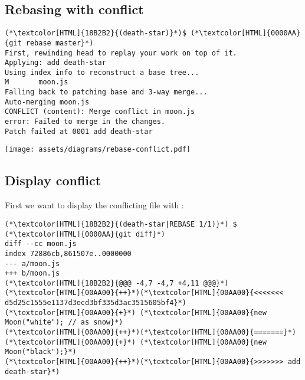 \subsection{Rebasing with conflict}
\begin{frame}[fragile]
  \subslidetitle
  \begin{lstlisting}
(*\textcolor[HTML]{18B2B2}{(death-star)}*)$ (*\textcolor[HTML]{0000AA}{git rebase master}*)
First, rewinding head to replay your work on top of it.
Applying: add death-star
Using index info to reconstruct a base tree...
M       moon.js
Falling back to patching base and 3-way merge...
Auto-merging moon.js
CONFLICT (content): Merge conflict in moon.js
error: Failed to merge in the changes.
Patch failed at 0001 add death-star
\end{lstlisting}

  \vspace{1em}
  \centerline{\texttt{[image: assets/diagrams/rebase-conflict.pdf]}}
\end{frame}

\subsection{Display conflict}
\begin{frame}[fragile]
  \subslidetitle
  First we want to display the conflicting file with :
  \begin{lstlisting}
(*\textcolor[HTML]{18B2B2}{(death-star|REBASE 1/1)}*) $ (*\textcolor[HTML]{0000AA}{git diff}*)
diff --cc moon.js
index 72886cb,861507e..0000000
--- a/moon.js
+++ b/moon.js
(*\textcolor[HTML]{18B2B2}{@@@ -4,7 -4,7 +4,11 @@@}*)
(*\textcolor[HTML]{00AA00}{++}*)(*\textcolor[HTML]{00AA00}{<<<<<<< d5d25c1555e1137d3ecd3bf335d3ac3515605bf4}*)
(*\textcolor[HTML]{00AA00}{+}*) (*\textcolor[HTML]{00AA00}{new Moon("white"); // as snow}*)
(*\textcolor[HTML]{00AA00}{++}*)(*\textcolor[HTML]{00AA00}{=======}*)
(*\textcolor[HTML]{00AA00}{+}*) (*\textcolor[HTML]{00AA00}{new Moon("black");}*)
(*\textcolor[HTML]{00AA00}{++}*)(*\textcolor[HTML]{00AA00}{>>>>>>> add death-star}*)

\end{lstlisting}
\end{frame}

